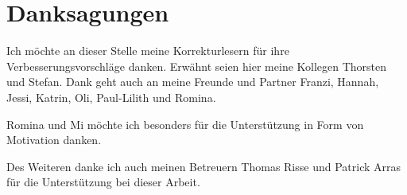 \thispagestyle{empty}
\section*{Danksagungen}

Ich möchte an dieser Stelle meine Korrekturlesern 
für ihre Verbesserungsvorschläge
danken.
Erwähnt seien hier meine Kollegen Thorsten und Stefan.
Dank geht auch an meine Freunde und Partner 
Franzi,
Hannah,
Jessi,
Katrin,
Oli,
Paul-Lilith
und
Romina.

Romina und Mi möchte ich besonders für die Unterstützung in Form von Motivation danken.

Des Weiteren danke ich auch meinen Betreuern Thomas Risse und Patrick Arras 
für die Unterstützung bei dieser Arbeit.

